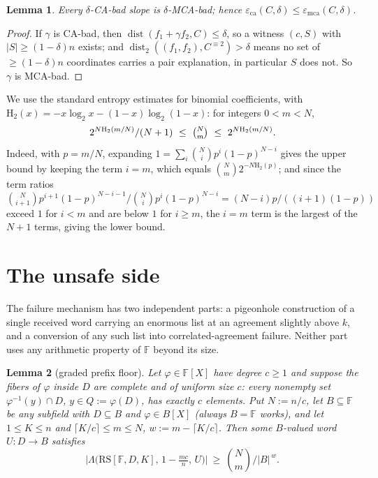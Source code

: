 \documentclass[11pt]{amsart}
\newtheorem{lemma}[lemma]{Lemma}
\theoremstyle{definition}
\theoremstyle{remark}
\newcommand{\F}{\mathbb{F}}
\newcommand{\RS}{\mathrm{RS}}
\newcommand{\dist}{\operatorname{dist}}
\newcommand{\eca}{\varepsilon_{\mathrm{ca}}}
\newcommand{\emca}{\varepsilon_{\mathrm{mca}}}
\newcommand{\Lst}{\Lambda}
\newcommand{\Hb}{\mathrm{H}_2}
\begin{document}
\begin{lemma}\label{lem:chain}
Every $\delta$-CA-bad slope is $\delta$-MCA-bad; hence $\eca(C,\delta)\le\emca(C,\delta)$.
\end{lemma}

\begin{proof}
If $\gamma$ is CA-bad, then $\dist(f_1+\gamma f_2,C)\le\delta$, so a witness $(c,S)$ with $|S|\ge(1-\delta)n$ exists; and $\dist_2((f_1,f_2),C^{\equiv2})>\delta$ means no set of $\ge(1-\delta)n$ coordinates carries a pair explanation, in particular $S$ does not. So $\gamma$ is MCA-bad.
\end{proof}

We use the standard entropy estimates for binomial coefficients, with $\Hb(x)=-x\log_2x-(1-x)\log_2(1-x)$: for integers $0<m<N$,
\begin{equation}\label{eq:entropy}
2^{N\Hb(m/N)}/(N+1)\ \le\ \tbinom Nm\ \le\ 2^{N\Hb(m/N)}.
\end{equation}
Indeed, with $p=m/N$, expanding $1=\sum_i\binom Ni p^i(1-p)^{N-i}$ gives the upper bound by keeping the term $i=m$, which equals $\binom Nm2^{-N\Hb(p)}$; and since the term ratios $\binom N{i+1}p^{i+1}(1-p)^{N-i-1}/\binom Nip^i(1-p)^{N-i}=(N-i)p/((i+1)(1-p))$ exceed $1$ for $i<m$ and are below $1$ for $i\ge m$, the $i=m$ term is the largest of the $N+1$ terms, giving the lower bound.

\section{The unsafe side}\label{sec:unsafe}

The failure mechanism has two independent parts: a pigeonhole construction of a single received word carrying an enormous list at an agreement slightly above $k$, and a conversion of any such list into correlated-agreement failure. Neither part uses any arithmetic property of $\F$ beyond its size.

\begin{lemma}[graded prefix floor]\label{lem:floor}
Let $\varphi\in\F[X]$ have degree $c\ge1$ and suppose the fibers of $\varphi$ inside $D$ are complete and of uniform size $c$: every nonempty set $\varphi^{-1}(y)\cap D$, $y\in Q:=\varphi(D)$, has exactly $c$ elements. Put $N:=n/c$, let $B\subseteq\F$ be any subfield with $D\subseteq B$ and $\varphi\in B[X]$ (always $B=\F$ works), and let $1\le K\le n$ and $\lceil K/c\rceil\le m\le N$, $w:=m-\lceil K/c\rceil$. Then some $B$-valued word $U\colon D\to B$ satisfies
\[
\bigl|\Lst\bigl(\RS[\F,D,K],\,1-\tfrac{mc}n,\,U\bigr)\bigr|\ \ge\ \binom Nm\Big/|B|^{\,w}.
\]
\end{lemma}
\end{document}
